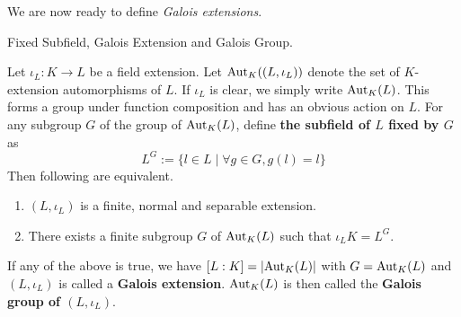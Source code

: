 \documentclass[../book.tex]{subfiles}
\begin{document}
We are now ready to define \emph{Galois extensions}. 

\begin{dfn} Fixed Subfield, Galois Extension and Galois Group.

    Let $\iota_L : K \to L$ be a field extension.
    Let $\text{Aut}_{K}((L,\iota_L))$ denote the set of $K$-extension automorphisms of $L$.
    If $\iota_L$ is clear, we simply write $\text{Aut}_{K}(L)$. 
    This forms a group under function composition and has an obvious action on $L$. 
    For any subgroup $G$ of the group of $\text{Aut}_{K}(L)$, 
    define \textbf{the subfield of $L$ fixed by $G$} as
    \[ L^G := \{l \in L \mid \forall g \in G, g(l)=l\} \]
    Then following are equivalent.
    \begin{enumerate}
        \item $(L,\iota_L)$ is a finite, normal and separable extension.
        \item There exists a finite subgroup $G$ of $\text{Aut}_{K}(L)$ such that
        $\iota_L K = L^G$. 
    \end{enumerate} 
    If any of the above is true, 
    we have $[L : K] = |\text{Aut}_{K}(L)|$ with $G = \text{Aut}_{K}(L)$
    and $(L,\iota_L)$ is called a \textbf{Galois extension}.
    $\text{Aut}_{K}(L)$ is then called the \textbf{Galois group of $(L,\iota_L)$}.
\end{dfn}
\end{document}
